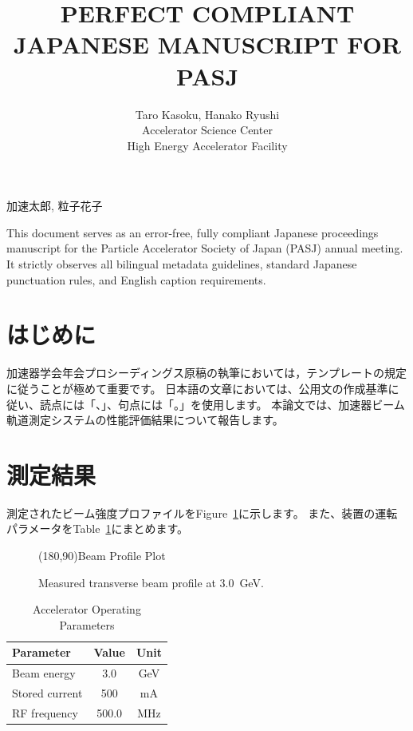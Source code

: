 \documentclass{PASJ2026}
\begin{document}
\title{PERFECT COMPLIANT JAPANESE MANUSCRIPT FOR PASJ}

\jauthor
{
加速太郎,
粒子花子
}

\author
{
Taro Kasoku,
Hanako Ryushi\\
 Accelerator Science Center\\
 High Energy Accelerator Facility\\
}

\Abstract
{
This document serves as an error-free, fully compliant Japanese proceedings manuscript for the Particle Accelerator Society of Japan (PASJ) annual meeting. It strictly observes all bilingual metadata guidelines, standard Japanese punctuation rules, and English caption requirements.
}

\maketitle

\section{はじめに}
加速器学会年会プロシーディングス原稿の執筆においては，テンプレートの規定に従うことが極めて重要です。
日本語の文章においては、公用文の作成基準に従い、読点には「、」、句点には「。」を使用します。
本論文では、加速器ビーム軌道測定システムの性能評価結果について報告します。

\section{測定結果}
測定されたビーム強度プロファイルをFigure~\ref{fig:profile}に示します。
また、装置の運転パラメータをTable~\ref{tab:params}にまとめます。

\begin{figure}[htb]
\centering
\framebox(180,90){Beam Profile Plot}
\caption{Measured transverse beam profile at 3.0~GeV.}
\label{fig:profile}
\end{figure}

\begin{table}[htb]
\caption{Accelerator Operating Parameters}
\label{tab:params}
\centering
\begin{tabular}{lcc}
\hline
Parameter & Value & Unit \\
\hline
Beam energy & 3.0 & GeV \\
Stored current & 500 & mA \\
RF frequency & 500.0 & MHz \\
\hline
\end{tabular}
\end{table}
\end{document}
